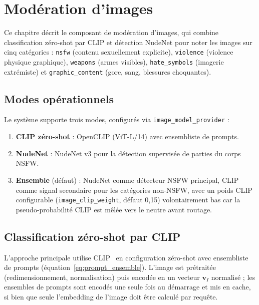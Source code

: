 \chapter{Modération d'images}
\label{ch:image_moderation}

Ce chapitre décrit le composant de modération d'images, qui combine classification zéro-shot par CLIP et détection NudeNet pour noter les images sur cinq catégories : \texttt{nsfw} (contenu sexuellement explicite), \texttt{violence} (violence physique graphique), \texttt{weapons} (armes visibles), \texttt{hate\_symbols} (imagerie extrémiste) et \texttt{graphic\_content} (gore, sang, blessures choquantes).

\section{Modes opérationnels}

Le système supporte trois modes, configurés via \texttt{image\_model\_provider} :
\begin{enumerate}[nosep]
  \item \textbf{CLIP zéro-shot} : OpenCLIP (ViT-L/14) avec ensembliste de prompts.
  \item \textbf{NudeNet} : NudeNet v3 pour la détection supervisée de parties du corps NSFW.
  \item \textbf{Ensemble} (défaut) : NudeNet comme détecteur NSFW principal, CLIP comme signal secondaire pour les catégories non-NSFW, avec un poids CLIP configurable (\texttt{image\_clip\_weight}, défaut 0,15) volontairement bas car la pseudo-probabilité CLIP est mêlée vers le neutre avant routage.
\end{enumerate}

\section{Classification zéro-shot par CLIP}

L'approche principale utilise CLIP~\cite{radford2021learning} en configuration zéro-shot avec ensembliste de prompts (équation~\ref{eq:prompt_ensemble}). L'image est prétraitée (redimensionnement, normalisation) puis encodée en un vecteur $\mathbf{v}_I$ normalisé ; les ensembles de prompts sont encodés une seule fois au démarrage et mis en cache, si bien que seule l'embedding de l'image doit être calculé par requête.

